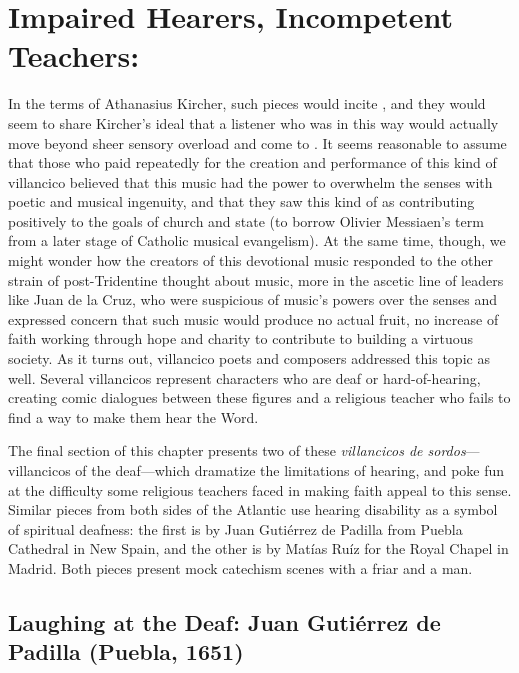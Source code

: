 \section{Impaired Hearers, Incompetent Teachers: }

In the terms of Athanasius Kircher, such pieces would incite
, and they would seem to
share Kircher's ideal that a listener who was  in this way would actually move beyond sheer sensory overload and come
to .%
    \Autocite[, ]{Kircher:Musurgia}  
It seems reasonable to assume that those who paid repeatedly for the creation
and performance of this kind of villancico believed that this music had the
power to overwhelm the senses with poetic and musical ingenuity, and that they
saw this kind of  as contributing positively to the goals of
church and state (to borrow Olivier Messiaen's term from a later stage of
Catholic musical evangelism).
At the same time, though, we might wonder how the creators of this devotional
music responded to the other strain of post-Tridentine thought about music, more
in the ascetic line of leaders like Juan de la Cruz, who were suspicious of
music's powers over the senses and expressed concern that such music would
produce no actual fruit, no increase of faith working through hope and charity
to contribute to building a virtuous society.
As it turns out, villancico poets and composers addressed this topic as well.
Several villancicos represent characters who are deaf or hard-of-hearing,
creating comic dialogues between these figures and a religious teacher who fails
to find a way to make them hear the Word.

The final section of this chapter presents two of these \emph{villancicos de
sordos}---villancicos of the deaf---which dramatize the limitations of hearing,
and poke fun at the difficulty some religious teachers faced in making faith
appeal to this sense.
Similar pieces from both sides of the Atlantic use hearing disability as a
symbol of spiritual deafness: the first is by Juan Gutiérrez de Padilla from
Puebla Cathedral in New Spain, and the other is by Matías Ruíz for the Royal
Chapel in Madrid.
Both pieces present mock catechism scenes with a friar and a  man.


\subsection{Laughing at the Deaf: Juan Gutiérrez de Padilla (Puebla, 1651)}

